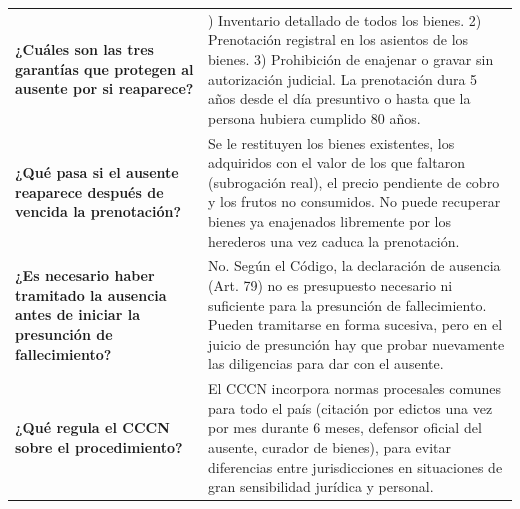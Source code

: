 \documentclass[12pt,oneside]{book}
\begin{document}
\begin{longtable}{
    >{\raggedright\arraybackslash}p{}
    >{\raggedright\arraybackslash}p{}
}
\textbf{¿Cuáles son las tres garantías que protegen al ausente por si
reaparece?} &
1) Inventario detallado de todos los bienes. 2) Prenotación registral en
los asientos de los bienes. 3) Prohibición de enajenar o gravar sin
autorización judicial. La prenotación dura 5 años desde el día presuntivo
o hasta que la persona hubiera cumplido 80 años. \\

\textbf{¿Qué pasa si el ausente reaparece después de vencida la
prenotación?} &
Se le restituyen los bienes existentes, los adquiridos con el valor de
los que faltaron (subrogación real), el precio pendiente de cobro y los
frutos no consumidos. No puede recuperar bienes ya enajenados libremente
por los herederos una vez caduca la prenotación. \\

\textbf{¿Es necesario haber tramitado la ausencia antes de iniciar la
presunción de fallecimiento?} &
No. Según el Código, la declaración de ausencia (Art. 79) no es
presupuesto necesario ni suficiente para la presunción de fallecimiento.
Pueden tramitarse en forma sucesiva, pero en el juicio de presunción hay
que probar nuevamente las diligencias para dar con el ausente. \\

\textbf{¿Qué regula el CCCN sobre el procedimiento?} &
El CCCN incorpora normas procesales comunes para todo el país (citación
por edictos una vez por mes durante 6 meses, defensor oficial del
ausente, curador de bienes), para evitar diferencias entre jurisdicciones
en situaciones de gran sensibilidad jurídica y personal. \\

\midrule


\end{longtable}
\end{document}
